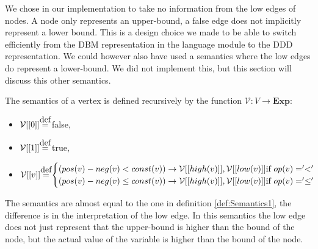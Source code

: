 \label{section:new-semantics}
We chose in our implementation to take no information from the low edges of nodes. A node only represents an upper-bound, a false edge does not implicitly represent a lower bound. This is a design choice we made to be able to switch efficiently from the DBM representation in the language module to the DDD representation. We could however also have used a semantics where the low edges do represent a lower-bound. We did not implement this, but this section will discuss this other semantics.

\begin{mydef}
\label{def:Semantics2}
The semantics of a vertex is defined recursively by the function $\mathcal{V}: V \rightarrow \textbf{Exp}:$
\begin{itemize}
\item $\mathcal{V}[[0]] \myeq$ false,
\item $\mathcal{V}[[1]] \myeq$ true,
\item \begin{math} \mathcal{V}[[v]] \myeq
\begin{cases}
(pos(v) - neg(v) < const(v)) \rightarrow \mathcal{V}[[high(v)]],\mathcal{V}[[low(v)]]\text{if }op(v) = '<'\\
(pos(v) - neg(v) \leq const(v)) \rightarrow \mathcal{V}[[high(v)]],\mathcal{V}[[low(v)]]\text{if }op(v) = '\leq'
\end{cases}
\end{math}

\end{itemize}

\end{mydef}
The semantics are almost equal to the one in definition \ref{def:Semantics1}, the difference is in the interpretation of the low edge. In this semantics the low edge does not just represent that the upper-bound is higher than the bound of the node, but the actual value of the variable is higher than the bound of the node. 

